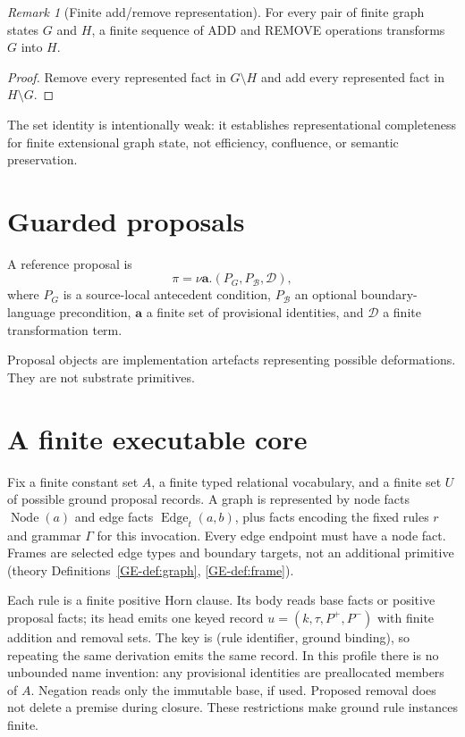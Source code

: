 \documentclass[11pt,a4paper]{article}
\theoremstyle{remark}
\newtheorem{remark}[theorem]{Remark}
\begin{document}
\begin{remark}[Finite add/remove representation]\label{thm:add-remove}
For every pair of finite graph states $G$ and $H$, a finite sequence of ADD and REMOVE operations transforms $G$ into $H$.
\end{remark}

\begin{proof}
Remove every represented fact in $G\setminus H$ and add every represented fact in $H\setminus G$.
\end{proof}

The set identity is intentionally weak: it establishes representational completeness for finite extensional graph state, not efficiency, confluence, or semantic preservation.

\section{Guarded proposals}\label{sec:proposals}

A reference proposal is
\[
\pi=\nu\mathbf a.(P_G,P_{\mathcal B},\mathcal D),
\]
where $P_G$ is a source-local antecedent condition, $P_{\mathcal B}$ an optional boundary-language precondition, $\mathbf a$ a finite set of provisional identities, and $\mathcal D$ a finite transformation term.

Proposal objects are implementation artefacts representing possible deformations. They are not substrate primitives.

\section{A finite executable core}\label{sec:finite-profile}
Fix a finite constant set $A$, a finite typed relational vocabulary, and a
finite set $U$ of possible ground proposal records. A graph is represented
by node facts $\operatorname{Node}(a)$ and edge facts
$\operatorname{Edge}_t(a,b)$, plus facts encoding the fixed rules $r$ and
grammar $\Gamma$ for this invocation. Every edge endpoint must have a node
fact. Frames are selected edge types and boundary targets, not an additional
primitive (theory Definitions~\ref{GE-def:graph}, \ref{GE-def:frame}).

Each rule is a finite positive Horn clause. Its body reads base facts or
positive proposal facts; its head emits one keyed record
$u=(k,\tau,P^+,P^-)$ with finite addition and removal sets. The key is
(rule identifier, ground binding), so repeating the same derivation emits
the same record. In this profile there is no unbounded name invention:
any provisional identities are preallocated members of $A$. Negation reads
only the immutable base, if used. Proposed removal does not delete a premise
during closure. These restrictions make ground rule instances finite.
\end{document}
